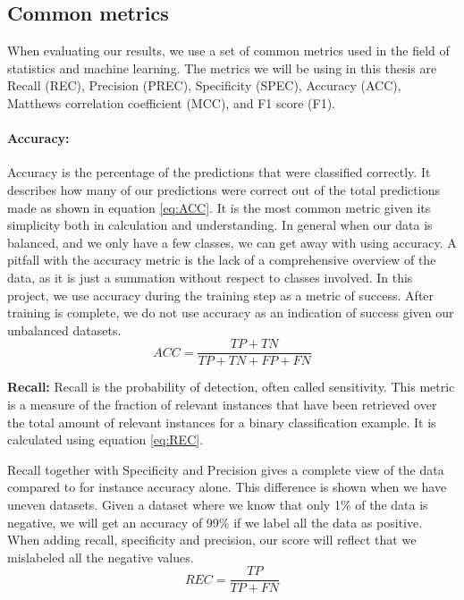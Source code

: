\subsection{Common metrics}
\label{cha:metrics}
When evaluating our results, we use a set of common metrics used in the field of statistics and machine learning.  The metrics we will be using in this thesis are Recall (REC), Precision (PREC), Specificity (SPEC), Accuracy (ACC), Matthews correlation coefficient (MCC), and F1 score (F1). 


\vspace{5px}
\paragraph{Accuracy:}  
Accuracy is the percentage of the predictions that were classified correctly.
It describes how many of our predictions were correct out of the total predictions made as shown in equation \ref{eq:ACC}. It is the most common metric given its simplicity both in calculation and understanding. 
In general when our data is balanced, and we only have a few classes, we can get away with using accuracy.
A pitfall with the accuracy metric is the lack of a comprehensive overview of the data, as it is just a summation without respect to classes involved.
In this project, we use accuracy during the training step as a metric of success. After training is complete, we do not use accuracy as an indication of success given our unbalanced datasets. 
 \begin{equation}
ACC=\frac{TP+TN}{TP+TN+FP+FN}
\label{eq:ACC}
\end{equation}

\vspace{5px}
\textbf{Recall:}  
Recall is the probability of detection, often called sensitivity.
This metric is a measure of the fraction of relevant instances that have been retrieved over the total amount of relevant instances for a binary classification example. It is calculated using equation \ref{eq:REC}.

Recall together with Specificity and Precision gives a complete view of the data compared to for instance accuracy alone. This difference is shown when we have uneven datasets. Given a dataset where we know that only 1\% of the data is negative, we will get an accuracy of 99\% if we label all the data as positive. When adding recall, specificity and precision, our score will reflect that we mislabeled all the negative values.
\begin{equation}
REC=\frac{TP}{TP+FN}
\label{eq:REC}
\end{equation}




